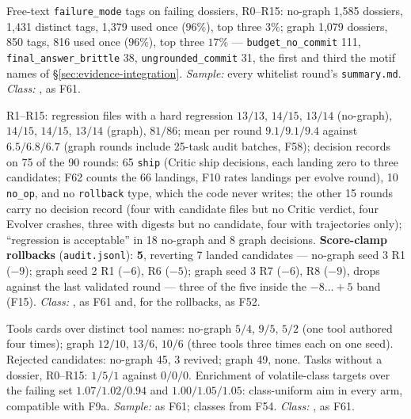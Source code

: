 \begin{description}[leftmargin=0pt,labelindent=0pt,labelsep=0pt,style=nextline,font=\normalfont,itemsep=6pt]
\item[\textbf{F65}\quad Digester failure-tag vocabulary.]
Free-text \texttt{failure\_mode} tags on failing dossiers, R0--R15: no-graph
1{,}585 dossiers, 1{,}431 distinct tags, 1{,}379 used once ($96\%$), top
three $3\%$; graph 1{,}079 dossiers, 850 tags, 816 used once ($96\%$), top
three $17\%$ --- \texttt{budget\_no\_commit} 111,
\texttt{final\_answer\_brittle} 38, \texttt{ungrounded\_commit} 31, the
first and third the motif names of \S\ref{sec:evidence-integration}.
\emph{Sample:} every whitelist round's \texttt{summary.md}. \emph{Class:}
, as F61.

\item[\textbf{F66}\quad Regressions surfaced, decisions taken, rollbacks.]
R1--R15: regression files with a hard regression $13/13$, $14/15$, $13/14$
(no-graph), $14/15$, $14/15$, $13/14$ (graph), $81/86$; mean per round
$9.1/9.1/9.4$ against $6.5/6.8/6.7$ (graph rounds include 25-task audit
batches, F58); decision records on 75 of the 90 rounds: 65 \texttt{ship}
(Critic ship decisions, each landing zero to three candidates; F62 counts
the 66 landings, F10 rates landings per evolve round), 10 \texttt{no\_op},
and no \texttt{rollback} type, which the code never writes; the other 15
rounds carry no decision record (four with candidate files but no Critic
verdict, four Evolver crashes, three with digests but no candidate, four
with trajectories only); ``regression is acceptable'' in 18 no-graph and 8
graph decisions. \textbf{Score-clamp
rollbacks} (\texttt{audit.jsonl}): \textbf{5}, reverting 7 landed
candidates --- no-graph seed 3 R1 ($-9$); graph seed 2 R1 ($-6$), R6
($-5$); graph seed 3 R7 ($-6$), R8 ($-9$), drops against the last validated
round --- three of the five inside the $-8\ldots{+}5$ band (F15).
\emph{Class:} , as F61 and, for the rollbacks, as F52.

\item[\textbf{F67}\quad Loop bookkeeping census.]
Tools cards over distinct tool names: no-graph $5/4$, $9/5$, $5/2$ (one tool
authored four times); graph $12/10$, $13/6$, $10/6$ (three tools three times
each on one seed). Rejected candidates: no-graph 45, 3 revived; graph 49,
none. Tasks without a dossier, R0--R15: $1/5/1$ against $0/0/0$. Enrichment of volatile-class
targets over the failing set $1.07/1.02/0.94$ and $1.00/1.05/1.05$:
class-uniform aim in every arm, compatible with F9a. \emph{Sample:} as F61;
classes from F54. \emph{Class:} , as F61.


\end{description}
